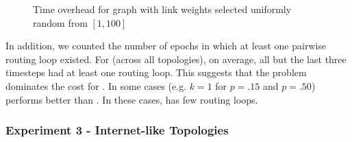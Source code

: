 \begin{figure*}[t]
\centering
{}
\caption{Time overhead for \er graph with link weights selected uniformly random from $[1,100]$}
\label{fig:epoch-rand}
\end{figure*} 





In addition, we counted the number of epochs in which at least one pairwise routing loop existed.  For \second (across all topologies), on average, all but the last three 
timesteps had at least one routing loop.  This suggests that the \infinity problem dominates the cost for \seconds. 
In some cases (e.g. $k=1$ for $p=.15$ and $p=.50$) \second performs better than \purges.  In these cases, \second has few routing loops.






\subsubsection{Experiment 3 - Internet-like Topologies}

